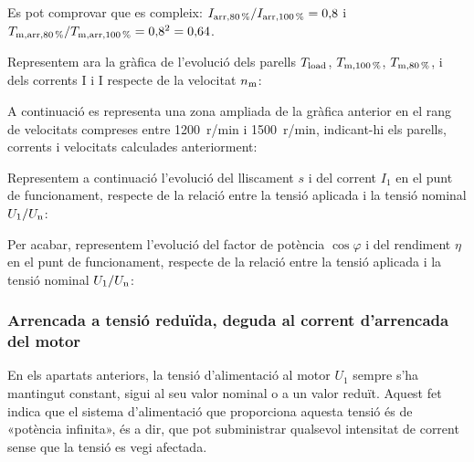\begin{exemple}
	Es pot comprovar que es compleix: $I_\mathrm{arr,\qty{80}{\%}} / I_\mathrm{arr,\qty{100}{\%}} = 0{,}8$ i $T_\mathrm{m,arr,\qty{80}{\%}} / T_\mathrm{m,arr,\qty{100}{\%}} = 0{,}8^2 = 0{,}64$.
		
 	Representem ara la gràfica de l'evolució dels parells $T_\mathrm{load}$,  $T_\mathrm{m,\qty{100}{\%}}$,  $T_\mathrm{m,\qty{80}{\%}}$, i dels	corrents I i I respecte de la velocitat $n_\mathrm{m}$:	
    \begin{center}
		\fontsize{10pt}{11pt}\selectfont
		
	\end{center}	

	\vspace{-2mm}
	A continuació es representa una zona ampliada de la gràfica anterior en el rang de velocitats compreses entre \qty{1200}{r/min} i  \qty{1500}{r/min}, indicant-hi els parells, corrents i velocitats calculades anteriorment:
	\begin{center}
		\fontsize{10pt}{11pt}\selectfont
		
	\end{center}
	Representem a continuació l'evolució del lliscament $s$ i del corrent $I_1$ en el punt de funcionament,  respecte de la relació entre la tensió aplicada i la tensió nominal $U_1/U_\mathrm{n}$:
	\vspace{-4mm}
	\begin{center}
		
	\end{center}
	\vspace{-4mm}
	Per acabar, representem l'evolució del factor de potència $\cos\varphi$ i del rendiment $\eta$ en el punt de funcionament, respecte de la relació entre la tensió aplicada i la tensió nominal $U_1/U_\mathrm{n}$:
	\vspace{-4mm}
	\begin{center}
		
	\end{center}
\end{exemple} 


\subsubsection{Arrencada a tensió reduïda, deguda al  corrent d'arrencada del motor}

En els apartats anteriors, la tensió d'alimentació al motor $U_1$ sempre s'ha mantingut constant, sigui al seu valor nominal o a un valor reduït. Aquest fet indica que el sistema d'alimentació que proporciona aquesta tensió és de «potència infinita», és a dir, que pot subministrar qualsevol intensitat de corrent sense que la tensió es vegi afectada.

